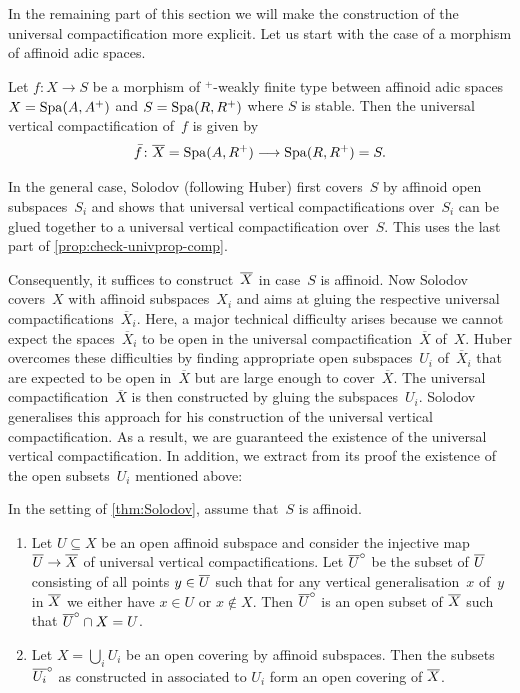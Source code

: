 In the remaining part of this section we will make the construction of the universal compactification more explicit.
Let us start with the case of a morphism of affinoid adic spaces.

\begin{prop} \label{prop:affinoid-compactification}
    Let $f\colon X\to S$ be a morphism of ${}^+$-weakly finite type between affinoid adic spaces $X = \operatorname{Spa}(A,A^+)$ and $S = \operatorname{Spa}(R,R^+)$ where $S$ is stable.
    Then the universal vertical compactification of~$f$ is given by
    \[
     \bar{f} \colon \overline{X} = \operatorname{Spa}(A,R^+) \longrightarrow \operatorname{Spa}(R,R^+) = S.
    \]   
\end{prop}

In the general case, Solodov (following Huber) first covers~$S$ by affinoid open subspaces~$S_i$ and shows that universal vertical compactifications over~$S_i$ can be glued together to a universal vertical compactification over~$S$.
This uses the last part of \cref{prop:check-univprop-comp}.

Consequently, it suffices to construct~$\overline{X}$ in case~$S$ is affinoid.
Now Solodov covers~$X$ with affinoid subspaces~$X_i$ and aims at gluing the respective universal compactifications~$\overline{X}_i$.
Here, a major technical difficulty arises because we cannot expect the spaces~$\overline{X}_i$ to be open in the universal compactification~$\overline{X}$ of~$X$.
Huber overcomes these difficulties by finding appropriate open subspaces~$U_i$ of~$\overline{X}_i$ that are expected to be open in~$\overline{X}$ but are large enough to cover~$\overline{X}$.
The universal compactification~$\overline{X}$ is then constructed by gluing the subspaces~$U_i$.
Solodov generalises this approach for his construction of the universal vertical compactification.
As a result, we are guaranteed the existence of the universal vertical compactification.
In addition, we extract from its proof the existence of the open subsets~$U_i$ mentioned above:

\begin{lem} \label{lem:interiors-cover}
    In the setting of \cref{thm:Solodov}, assume that~$S$ is affinoid. 
    \begin{enumerate}[(1)]
        \item \label{lemitem:interior-open}
        Let $U \subseteq X$ be an open affinoid subspace and consider the injective map $\overline{U} \to \overline{X}$ of universal vertical compactifications. Let $\overline{U}^\circ$ be the subset of $\overline{U}$ consisting of all points $y \in \overline{U}$ such that for any vertical generalisation~$x$ of~$y$ in $\overline{X}$ we either have $x \in U$ or $x \notin X$. 
        Then $\overline{U}^\circ$ is an open subset of $\overline{X}$ such that $\overline{U}^\circ \cap X = U$.

        \item \label{lemitem:interior-open-covering}
        Let $X = \bigcup_i U_i$ be an open covering by affinoid subspaces. Then the subsets $\overline{U_i}^\circ$ as constructed in  associated to $U_i$ form an open covering of $\overline{X}$.
    \end{enumerate}
\end{lem}

